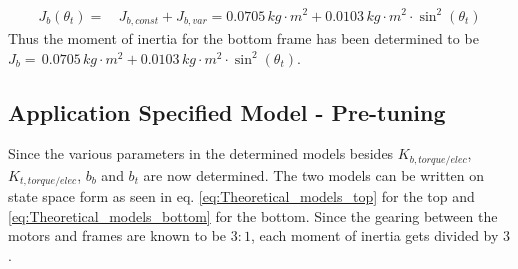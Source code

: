 \documentclass[../../main]{subfiles}
\begin{document}
\begin{equation}
  \label{eq:BottomFrame_moment_of_inertia}
\begin{split}
    J_{b}(\theta_t) =& \, J_{b,const} + J_{b,var} = 0.0705\si{\,kg\cdot m^2} + 0.0103 \si{\,kg\cdot m^2}\cdot \sin^2(\theta_t)
\end{split}
\end{equation}
Thus the moment of inertia for the bottom frame has been determined to be
\newline $J_{b} = \, 0.0705\si{\,kg\cdot m^2} + 0.0103 \si{\,kg\cdot m^2}\cdot \sin^2(\theta_t)$.

\subsection{Application Specified Model - Pre-tuning}
Since the various parameters in the determined models besides $K_{b,torque/elec}$, $K_{t,torque/elec}$, $b_b$ and $b_t$ are now determined. The two models can be written on state space form as seen in eq. \eqref{eq:Theoretical_models_top} for the top and \eqref{eq:Theoretical_models_bottom} for the bottom. Since the gearing between the motors and frames are known to be $3:1$, each moment of inertia gets divided by $3$.
\end{document}
